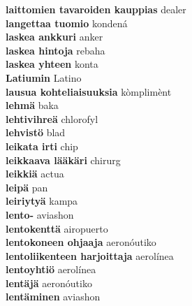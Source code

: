 \textbf{ laittomien tavaroiden kauppias  } dealer \\
\textbf{ langettaa tuomio  } kondená \\
\textbf{ laskea ankkuri  } anker \\
\textbf{ laskea hintoja  } rebaha \\
\textbf{ laskea yhteen  } konta \\
\textbf{ Latiumin  } Latino \\
\textbf{ lausua kohteliaisuuksia  } kòmplimènt \\
\textbf{ lehmä  } baka \\
\textbf{ lehtivihreä  } chlorofyl \\
\textbf{ lehvistö  } blad \\
\textbf{ leikata irti  } chip \\
\textbf{ leikkaava lääkäri  } chirurg \\
\textbf{ leikkiä  } actua \\
\textbf{ leipä  } pan \\
\textbf{ leiriytyä  } kampa \\
\textbf{ lento-  } aviashon \\
\textbf{ lentokenttä  } airopuerto \\
\textbf{ lentokoneen ohjaaja  } aeronóutiko \\
\textbf{ lentoliikenteen harjoittaja  } aerolínea \\
\textbf{ lentoyhtiö  } aerolínea \\
\textbf{ lentäjä  } aeronóutiko \\
\textbf{ lentäminen  } aviashon \\

